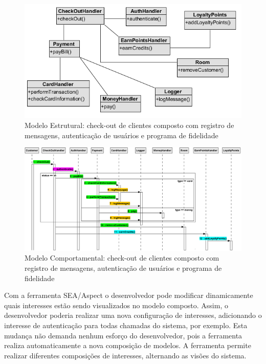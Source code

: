   \begin{figure}[!h]
	\centering
	\includegraphics{img/case_study_2_compound_structural.png}
	\caption{Modelo Estrutural: check-out de clientes composto com registro de mensagens, autenticação de usuários e programa de
	fidelidade}\label{fig:case_study_2_compound_structural}
  \end{figure}

  \begin{landscape}
  \begin{figure}[tb]
	\centering
	\includegraphics[scale=0.7]{img/case_study_2_compound.png}
	\caption{Modelo Comportamental: check-out de clientes composto com registro de mensagens, autenticação de usuários e programa de
	fidelidade}\label{fig:case_study_2_compound}
  \end{figure}
\end{landscape}

Com a ferramenta SEA/Aspect o desenvolvedor pode modificar dinamicamente quais interesses estão sendo visualizados no modelo composto. Assim, o
desenvolvedor poderia realizar uma nova configuração de interesses, adicionando o interesse de autenticação para todas chamadas do sistema, por
exemplo. Esta mudança não demanda nenhum esforço do desenvolvedor, pois a ferramenta realiza automaticamente a nova composição de modelos. A
ferramenta permite realizar diferentes composições de interesses, alternando as visões do sistema.

